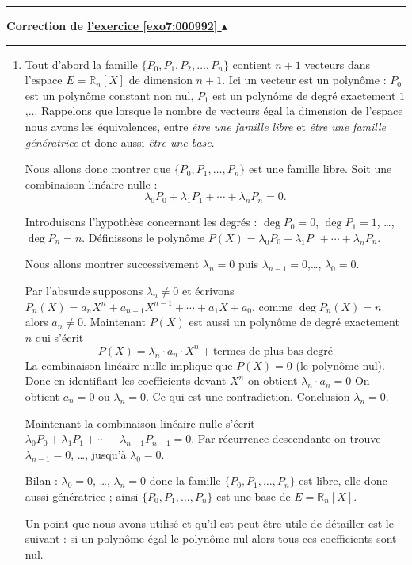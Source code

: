 \documentclass[11pt,a4paper]{article}
\newcommand{\Rr}{\mathbb{R}} \newcommand{\R}{\mathbb{R}}
\newcounter{exo}
\newcommand{\correction}[1]{\hypertarget{cor7:#1}{}\label{cor7:#1}{\bf Correction de \hyperlink{exo7:#1}{l'exercice \ref{exo7:#1} $\blacktriangle$}}\vspace{1mm}\hrule\vspace{1mm}}
\newcommand{\fincorrection}{\vspace{1mm}\hrule\vspace*{7mm}}
\begin{document}
\fincorrection
\correction{000992}
\begin{enumerate}
  \item Tout d'abord la famille $\{P_0,P_1,P_2,\ldots,P_n\}$ contient $n+1$ vecteurs 
dans l'espace $E=\Rr_n[X]$ de dimension $n+1$. Ici un vecteur est un polynôme :
$P_0$ est un polynôme constant non nul, $P_1$ est un polynôme de degré exactement $1$,...
Rappelons que lorsque le nombre de vecteurs égal la dimension de l'espace  nous avons les équivalences, entre 
\emph{être une famille libre} et \emph{être une famille génératrice} et donc aussi \emph{être une base}.

\medskip

Nous allons donc montrer que $\{P_0,P_1,\ldots,P_n\}$ est une famille libre.
Soit une combinaison linéaire nulle :
$$\lambda_0 P_0+\lambda_1 P_1 + \cdots + \lambda_n P_n = 0.$$

Introduisons l'hypothèse concernant les degrés :
$\deg P_0 = 0$, $\deg P_1=1$, \ldots, $\deg P_n=n$.
Définissons le polynôme $P(X) = \lambda_0 P_0+\lambda_1 P_1 + \cdots + \lambda_n P_n$.

\medskip

Nous allons montrer successivement $\lambda_n=0$ puis $\lambda_{n-1}=0$,\ldots, $\lambda_0=0$.

Par l'absurde supposons $\lambda_n \neq 0$ et écrivons 
$P_n(X) = a_n X^n + a_{n-1}X^{n-1}+\cdots+a_1X+a_0$, comme
$\deg P_n(X)=n$ alors $a_n\neq0$.
Maintenant 
$P(X)$ est aussi un polynôme de degré exactement $n$ qui s'écrit
$$P(X) = \lambda_n \cdot a_n \cdot X^n + \text{termes de plus bas degré}$$
La combinaison linéaire nulle implique que $P(X)=0$ (le polynôme nul).
Donc en identifiant les coefficients devant $X^n$ on obtient $\lambda_n\cdot a_n=0$
On obtient  $a_n=0$ ou $\lambda_n=0$. Ce qui est une contradiction.
Conclusion $\lambda_n=0$.

\medskip

Maintenant la combinaison linéaire nulle s'écrit $\lambda_0 P_0+\lambda_1 P_1 + \cdots + \lambda_{n-1} P_{n-1}=0$.
Par récurrence descendante on trouve $\lambda_{n-1}=0$, \ldots, jusqu'à $\lambda_0=0$.

Bilan : $\lambda_0=0$, \ldots, $\lambda_n=0$ donc la famille $\{P_0,P_1,\ldots,P_n\}$ est libre,
elle donc aussi génératrice ; ainsi $\{P_0,P_1,\ldots,P_n\}$ est une base de $E=\Rr_n[X]$.

\medskip

Un point que nous avons utilisé et qu'il est peut-être utile de détailler est le suivant : 
si un polynôme égal le polynôme nul alors tous ces coefficients sont nul.


\end{enumerate}
\end{document}
